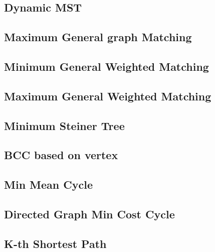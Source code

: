 \documentclass[a4paper,10pt,twocolumn,oneside]{article}
\begin{document}
\subsection{Dynamic MST}


\subsection{Maximum General graph Matching}


\subsection{Minimum General Weighted Matching}


\subsection{Maximum General Weighted Matching}


\subsection{Minimum Steiner Tree}


\subsection{BCC based on vertex}


\subsection{Min Mean Cycle}


\subsection{Directed Graph Min Cost Cycle}


\subsection{K-th Shortest Path}


%
\end{document}
